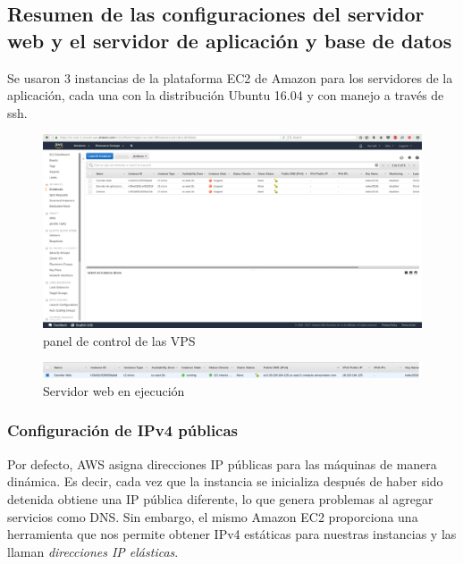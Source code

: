 \documentclass[9pt]{article}
\begin{document}
\subsection*{Resumen de las configuraciones del servidor web y el servidor de aplicación y base de datos}
Se usaron 3 instancias de la plataforma \textsf{EC2} de Amazon para los servidores de la aplicación, cada una con la distribución \textsf{Ubuntu 16.04} y con manejo a través de \textsf{ssh}. 
\begin{figure}[H]
  \centering
  \includegraphics[width=\textwidth]{instances_dashboard}
  \caption{panel de control de las VPS}
\end{figure}
\begin{figure}[H]
  \centering
  \includegraphics[width=\textwidth]{web_server}
  \caption{Servidor web en ejecución}
\end{figure}

\subsubsection*{Configuración de IPv4 públicas}
Por defecto, \textsf{AWS} asigna direcciones IP públicas para las máquinas de manera dinámica. Es decir, cada vez que la instancia se inicializa después de haber sido detenida obtiene una IP pública diferente, lo que genera problemas al agregar servicios como DNS. Sin embargo, el mismo \textsf{Amazon EC2} proporciona una herramienta que nos permite obtener IPv4 estáticas para nuestras instancias y las llaman \textit{direcciones IP elásticas}.\\
\end{document}
